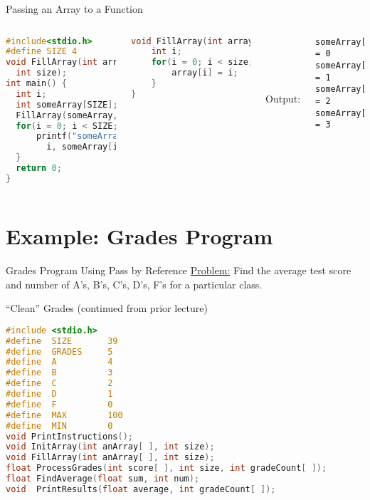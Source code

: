\documentclass[graphics]{beamer}
\begin{document}
\begin{frame}[fragile]{Passing an Array to a Function}
    \begin{columns}
        \column[t]{5cm}
            \begin{lstlisting}[language=C,basicstyle=\scriptsize,keywordstyle=\color{blue},commentstyle=\color{green},showstringspaces=false,stringstyle=\color{red},tabsize=2]
#include<stdio.h>
#define SIZE 4
void FillArray(int array[],
  int size);
int main() {
  int i;
  int someArray[SIZE];
  FillArray(someArray, SIZE);
  for(i = 0; i < SIZE; i++) {
      printf("someArray[%d] = %d\n",
        i, someArray[i]);
  }
  return 0;
}
            \end{lstlisting}
        \column[t]{6cm}
            \begin{lstlisting}[language=C,basicstyle=\scriptsize,keywordstyle=\color{blue},commentstyle=\color{green},showstringspaces=false,stringstyle=\color{red}]
void FillArray(int array[], int size) {
    int i;
    for(i = 0; i < size; i++) {
        array[i] = i;
    }
}
            \end{lstlisting}
            ~~ \\ ~~ \\ ~~ \\ ~~ \\ Output:
            \footnotesize
            \begin{verbatim}
someArray[0] = 0
someArray[1] = 1
someArray[2] = 2
someArray[3] = 3
            \end{verbatim}
    \end{columns}
\end{frame}

\section{Example: Grades Program}
\begin{frame}{Grades Program Using Pass by Reference}
    \underline{Problem:} Find the average test score and number of A's, B's, C's, D's, F's for a particular class.
\end{frame}

\begin{frame}[fragile]{``Clean'' Grades (continued from prior lecture)}
    \begin{lstlisting}[language=C,basicstyle=\scriptsize,keywordstyle=\color{blue},commentstyle=\color{green},showstringspaces=false,stringstyle=\color{red}]
#include <stdio.h>
#define  SIZE       39
#define  GRADES     5
#define  A          4
#define  B          3
#define  C          2
#define  D          1
#define  F          0
#define  MAX        100
#define  MIN        0
void PrintInstructions();
void InitArray(int anArray[ ], int size);
void FillArray(int anArray[ ], int size);
float ProcessGrades(int score[ ], int size, int gradeCount[ ]);
float FindAverage(float sum, int num);
void  PrintResults(float average, int gradeCount[ ]);
    \end{lstlisting}
\end{frame}
\end{document}
